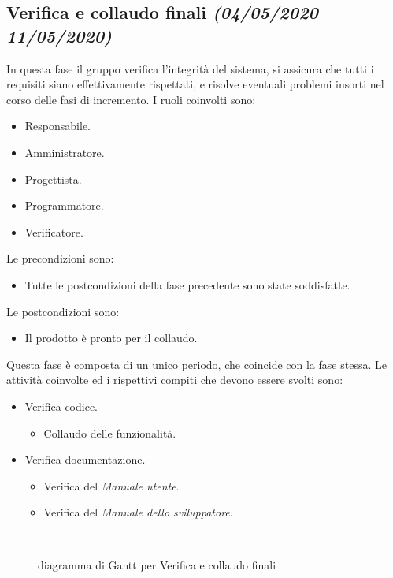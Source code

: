 \documentclass[../piano-di-progetto.tex]{subfiles}
\begin{document}
\subsection[Verifica e collaudo finali]{Verifica e collaudo finali {\normalsize\normalfont\itshape(04/05/2020  11/05/2020)}}%
\label{sub:verifica_e_collaudo_finali}
In questa fase il gruppo verifica l'integrità del sistema, si assicura che tutti i requisiti siano effettivamente rispettati, e risolve eventuali problemi insorti nel corso delle fasi di incremento.
I ruoli coinvolti sono:
\begin{itemize}
  \item Responsabile.
  \item Amministratore.
  \item Progettista.
  \item Programmatore.
  \item Verificatore.
\end{itemize}
Le precondizioni sono:
\begin{itemize}
  \item Tutte le postcondizioni della fase precedente sono state soddisfatte.
\end{itemize}
Le postcondizioni sono:
\begin{itemize}
  \item Il prodotto è pronto per il collaudo.
\end{itemize}
Questa fase è composta di un unico periodo, che coincide con la fase stessa.
Le attività coinvolte ed i rispettivi compiti che devono essere svolti sono:
\begin{itemize}
  \item Verifica codice.
  \begin{itemize}
    \item Collaudo delle funzionalità.
  \end{itemize}
  \item Verifica documentazione.
  \begin{itemize}
    \item Verifica del \textit{Manuale utente}.
    \item Verifica del \textit{Manuale dello sviluppatore}.
  \end{itemize}
\end{itemize}
\begin{figure}[H]
  \centering
  
  \caption{diagramma di Gantt per Verifica e collaudo finali}%
~~\label{fig:gantt_verifica_e_collaudo_finali}
\end{figure}
\end{document}
